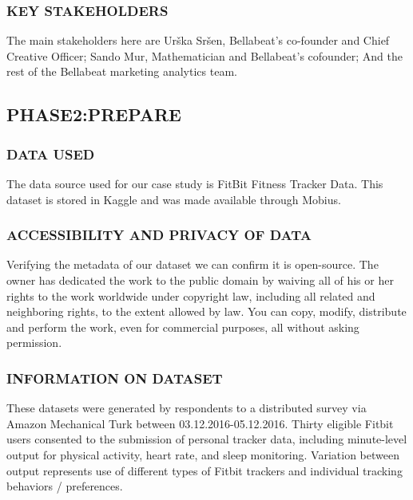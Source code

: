 \documentclass[
]{article}
\begin{document}
\hypertarget{key-stakeholders}{%
\subsubsection{KEY STAKEHOLDERS}\label{key-stakeholders}}

The main stakeholders here are Urška Sršen, Bellabeat's co-founder and
Chief Creative Officer; Sando Mur, Mathematician and Bellabeat's
cofounder; And the rest of the Bellabeat marketing analytics team.

\hypertarget{phase2prepare}{%
\subsection{PHASE2:PREPARE}\label{phase2prepare}}

\hypertarget{data-used}{%
\subsubsection{DATA USED}\label{data-used}}

The data source used for our case study is FitBit Fitness Tracker Data.
This dataset is stored in Kaggle and was made available through Mobius.

\hypertarget{accessibility-and-privacy-of-data}{%
\subsubsection{ACCESSIBILITY AND PRIVACY OF
DATA}\label{accessibility-and-privacy-of-data}}

Verifying the metadata of our dataset we can confirm it is open-source.
The owner has dedicated the work to the public domain by waiving all of
his or her rights to the work worldwide under copyright law, including
all related and neighboring rights, to the extent allowed by law. You
can copy, modify, distribute and perform the work, even for commercial
purposes, all without asking permission.

\hypertarget{information-on-dataset}{%
\subsubsection{INFORMATION ON DATASET}\label{information-on-dataset}}

These datasets were generated by respondents to a distributed survey via
Amazon Mechanical Turk between 03.12.2016-05.12.2016. Thirty eligible
Fitbit users consented to the submission of personal tracker data,
including minute-level output for physical activity, heart rate, and
sleep monitoring. Variation between output represents use of different
types of Fitbit trackers and individual tracking behaviors /
preferences.
\end{document}
